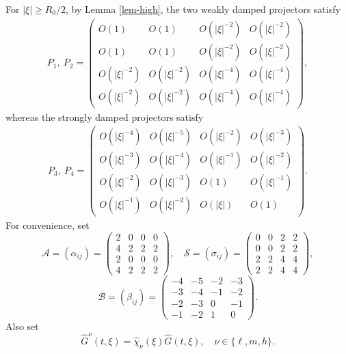 \documentclass[10pt,reqno]{amsart}
\numberwithin{equation}{section}
\begin{document}
For $|\xi|\ge R_0/2$, by Lemma \ref{lem-high}, the two weakly damped projectors satisfy
\begin{align}\label{high-P12}
P_1,\ P_2=
\begin{pmatrix}
O(1)&O(1)&O(|\xi|^{-2})&O(|\xi|^{-2})\\
O(1)&O(1)&O(|\xi|^{-2})&O(|\xi|^{-2})\\
O(|\xi|^{-2})&O(|\xi|^{-2})&O(|\xi|^{-4})&O(|\xi|^{-4})\\
O(|\xi|^{-2})&O(|\xi|^{-2})&O(|\xi|^{-4})&O(|\xi|^{-4})
\end{pmatrix},
\end{align}
whereas the strongly damped projectors satisfy
\begin{align}\label{high-P34}
P_3,\ P_4=
\begin{pmatrix}
O(|\xi|^{-4})&O(|\xi|^{-5})&O(|\xi|^{-2})&O(|\xi|^{-3})\\
O(|\xi|^{-3})&O(|\xi|^{-4})&O(|\xi|^{-1})&O(|\xi|^{-2})\\
O(|\xi|^{-2})&O(|\xi|^{-3})&O(1)&O(|\xi|^{-1})\\
O(|\xi|^{-1})&O(|\xi|^{-2})&O(|\xi|)&O(1)
\end{pmatrix}.
\end{align}
For convenience, set
\[
\mathcal A=(\alpha_{ij})=
\begin{pmatrix}
2&0&0&0\\
4&2&2&2\\
2&0&0&0\\
4&2&2&2
\end{pmatrix},\quad
\mathcal S=(\sigma_{ij})=
\begin{pmatrix}
0&0&2&2\\
0&0&2&2\\
2&2&4&4\\
2&2&4&4
\end{pmatrix},
\]
\[
\mathcal B=(\beta_{ij})=
\begin{pmatrix}
-4&-5&-2&-3\\
-3&-4&-1&-2\\
-2&-3&0&-1\\
-1&-2&1&0
\end{pmatrix}.
\]
Also set
\[
\widehat G^\nu(t,\xi)=\widehat\chi_\nu(\xi)\widehat G(t,\xi),
\quad \nu\in\{\ell,m,h\}.
\]
\end{document}
